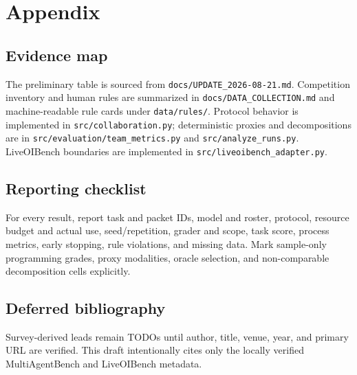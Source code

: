 \section{Appendix}
\subsection{Evidence map}
The preliminary table is sourced from
\texttt{docs/UPDATE\_2026-08-21.md}. Competition inventory and human rules are
summarized in \texttt{docs/DATA\_COLLECTION.md} and machine-readable rule cards
under \texttt{data/rules/}. Protocol behavior is implemented in
\texttt{src/collaboration.py}; deterministic proxies and decompositions are in
\texttt{src/evaluation/team\_metrics.py} and
\texttt{src/analyze\_runs.py}. LiveOIBench boundaries are implemented in
\texttt{src/liveoibench\_adapter.py}.

\subsection{Reporting checklist}
For every result, report task and packet IDs, model and roster, protocol,
resource budget and actual use, seed/repetition, grader and scope, task score,
process metrics, early stopping, rule violations, and missing data. Mark
sample-only programming grades, proxy modalities, oracle selection, and
non-comparable decomposition cells explicitly.

\subsection{Deferred bibliography}
Survey-derived leads remain TODOs until author, title, venue, year, and primary
URL are verified. This draft intentionally cites only the locally verified
MultiAgentBench and LiveOIBench metadata.
